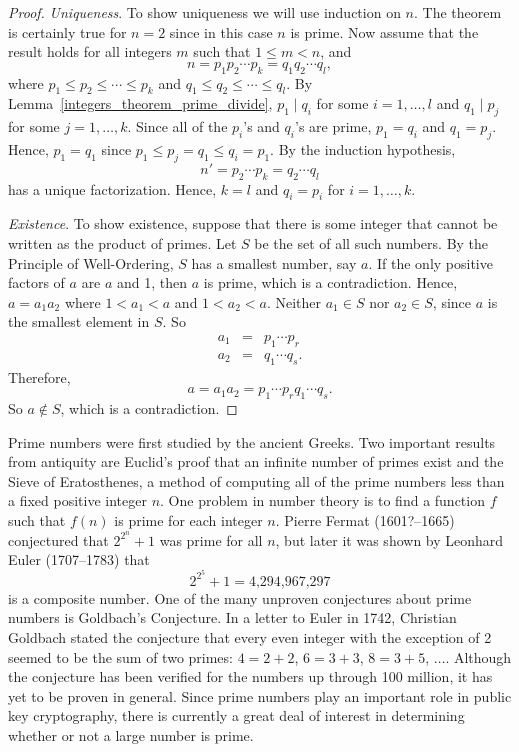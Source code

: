 \begin{proof}
{\em Uniqueness}.
To show uniqueness we will use induction on $n$. The theorem is certainly true for $n = 2$ since in this case $n$ is prime.  Now assume that the result holds for all integers $m$ such that $1 \leq m < n$, and 
\[
n = p_1 p_2 \cdots p_k = q_1 q_2 \cdots q_l,
\]
where $p_1 \leq p_2 \leq \cdots \leq p_k$ and $q_1 \leq q_2 \leq \cdots \leq q_l$. By Lemma~\ref{integers_theorem_prime_divide}, $p_1  \mid  q_i$ for some $i = 1, \ldots, l$ and $q_1  \mid  p_j$ for some $j = 1, \ldots, k$.  Since all of the $p_i$'s and $q_i$'s are prime, $p_1 = q_i$ and  $q_1 = p_j$. Hence, $p_1 = q_1$ since $p_1 \leq p_j = q_1 \leq q_i = p_1$.  By the induction hypothesis, 
\[
n' = p_2 \cdots p_k = q_2 \cdots q_l
\]
has a unique factorization.  Hence, $k=l$ and $q_i = p_i$ for $i = 1, \ldots, k$. 

{\em Existence}.
To show existence, suppose that there is some integer that cannot be written as the product of primes.  Let $S$ be the set of all such numbers.  By the Principle of Well-Ordering, $S$ has a smallest number, say $a$.  If the only positive factors of $a$ are $a$ and 1, then $a$ is prime, which is a contradiction.  Hence, $a = a_1 a_2$ where $1 < a_1 < a$ and $1 < a_2 < a$.  Neither $a_1\in S$ nor $a_2 \in S$, since $a$ is the smallest element in $S$.  So 
\begin{eqnarray*}
a_1 & = & p_1 \cdots p_r \\
a_2 & = & q_1 \cdots q_s.
\end{eqnarray*}
Therefore,
\[
a = a_1 a_2 = p_1 \cdots p_r q_1 \cdots q_s.
\]
So $a \notin S$, which is a contradiction.
\end{proof}
 
\histhead

\noindent
\parbox{\textwidth}
{\small \histf
Prime numbers were first studied by the ancient Greeks.  Two important results from antiquity are Euclid's proof that an infinite number of primes exist and the Sieve of Eratosthenes, a method of computing all of the prime numbers less than a fixed positive integer $n$.  One problem in number theory is to find a function $f$ such that $f(n)$ is prime for each integer $n$. Pierre Fermat (1601?--1665) conjectured that $2^{2^n} + 1$ was prime for all $n$, but later it was shown by Leonhard Euler (1707--1783) that 
\[
2^{2^5} + 1 = \mbox{4,294,967,297}
\]
is a composite number. One of the many unproven conjectures about prime numbers is Goldbach's Conjecture.  In a letter to Euler in 1742, Christian Goldbach stated the conjecture that every even integer with the exception of 2 seemed to be the sum of two primes:  $4 = 2 + 2$, $6 = 3 + 3$, $8 =3 + 5$, $\ldots$.  Although the conjecture has been verified for the numbers up through 100 million, it has yet to be proven in general.  Since prime numbers play an important role in public key cryptography, there is currently a great deal of interest in determining whether or not a large number is prime.
\histbox
}


